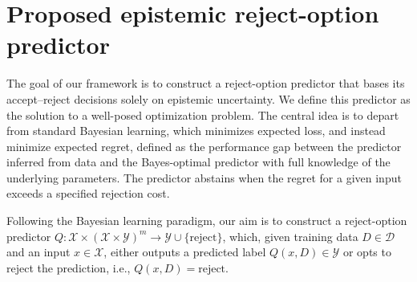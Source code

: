 \section{Proposed epistemic reject-option predictor}
\label{sec:ProposedEpistemRejOption}

The goal of our framework is to construct a reject-option predictor that bases its accept–reject decisions solely on epistemic uncertainty. We define this predictor as the solution to a well-posed optimization problem. The central idea is to depart from standard Bayesian learning, which minimizes expected loss, and instead minimize expected regret, defined as the performance gap between the predictor inferred from data and the Bayes-optimal predictor with full knowledge of the underlying parameters. The predictor abstains when the regret for a given input exceeds a specified rejection cost.

Following the Bayesian learning paradigm, our aim is to construct a reject-option predictor $Q \colon \mathcal{X} \times (\mathcal{X} \times \mathcal{Y})^m \rightarrow \mathcal{Y} \cup \{ \text{reject} \}$,  which, given training data $D \in \mathcal{D}$ and an input $x \in \mathcal{X}$, either outputs a predicted label $Q(x, D) \in \mathcal{Y}$ or opts to reject the prediction, i.e., $Q(x, D) = \text{reject}$.


